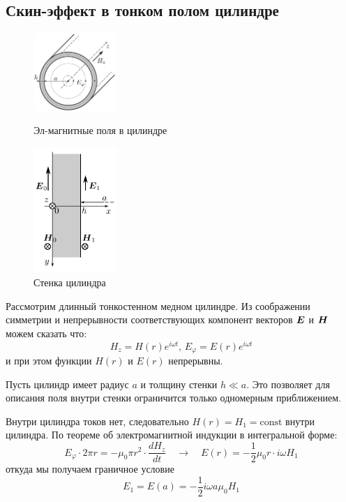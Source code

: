 \documentclass{article}
\begin{document}
\subsection{Скин-эффект в тонком полом цилиндре}
\vspace{1cm}
\begin{figure}
  \begin{center}
    \includegraphics[width=0.28\textwidth]{cilindr}
  \end{center}
  \caption{Эл-магнитные поля в цилиндре}\label{fig:cilindr}

  \begin{center}
    \includegraphics[width=0.28\textwidth]{stenka}
  \end{center}
  \caption{Стенка цилиндра}\label{fig:stenka}
\end{figure}

Рассмотрим длинный тонкостенном медном цилиндре. Из соображении симметрии и 
непрерывности соответствующих компонент векторов $\vb*{E}$ и $\vb*{H}$ можем сказать что:
\begin{equation}
    H_z = H(r)e^{i\omega t} \text{, } E_\varphi = E(r)e^{i\omega t}
\end{equation}
и при этом функции $H(r)$ и $E(r)$ непрерывны.

Пусть цилиндр имеет радиус $a$ и толщину стенки $h \ll a$. Это позволяет для описания поля внутри стенки ограничится только одномерным приближением.

Внутри цилиндра токов нет, следовательно $H(r)=H_1=\text{const}$ внутри цилиндра.
По теореме об электромагнитной индукции в интегральной форме:
\begin{equation}
    E_{\varphi} \cdot 2 \pi r = - \mu_0 \pi r^2 \cdot \frac{dH_z}{dt} \quad \rightarrow \quad E(r) = -\frac{1}{2}\mu_0 r \cdot i \omega H_1
\end{equation}
откуда мы получаем граничное условие
\begin{equation}
    E_1=E(a)= -\frac{1}{2}i \omega a \mu_0 H_1
    \label{eq:granichnoe_uslovie_E}
\end{equation}
\end{document}
